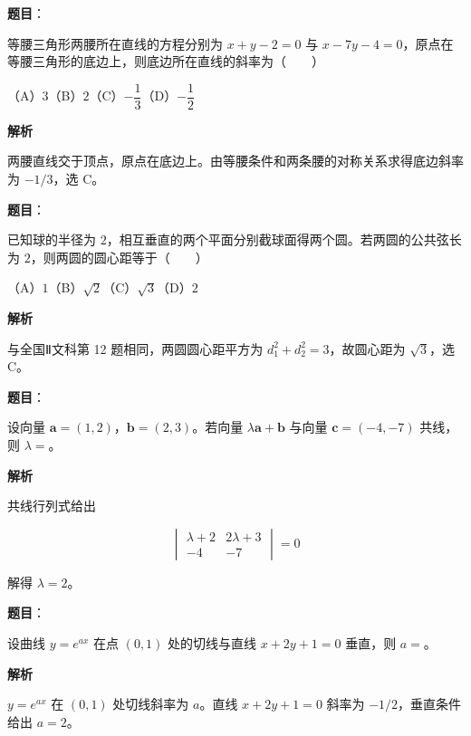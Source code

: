 \begin{answer}

\textbf{题目}：

等腰三角形两腰所在直线的方程分别为 $x+y-2=0$ 与 $x-7y-4=0$，原点在等腰三角形的底边上，则底边所在直线的斜率为\mbox{（　　）}

（A）$3$\quad（B）$2$\quad（C）$-\dfrac13$\quad（D）$-\dfrac12$

\textbf{解析}

两腰直线交于顶点，原点在底边上。由等腰条件和两条腰的对称关系求得底边斜率为 $-1/3$，选 C。


\end{answer}
\begin{answer}

\textbf{题目}：

已知球的半径为 $2$，相互垂直的两个平面分别截球面得两个圆。若两圆的公共弦长为 $2$，则两圆的圆心距等于\mbox{（　　）}

（A）$1$\quad（B）$\sqrt2$\quad（C）$\sqrt3$\quad（D）$2$

\textbf{解析}

与全国Ⅱ文科第 12 题相同，两圆圆心距平方为 $d_1^2+d_2^2=3$，故圆心距为 $\sqrt3$，选 C。


\end{answer}
\begin{answer}

\textbf{题目}：

设向量 $\boldsymbol a=(1,2)$，$\boldsymbol b=(2,3)$。若向量 $\lambda\boldsymbol a+\boldsymbol b$ 与向量 $\boldsymbol c=(-4,-7)$ 共线，则 $\lambda=$\gkblank{}。

\textbf{解析}

共线行列式给出

\nopagebreak[4]
\[
\begin{vmatrix}\lambda+2&2\lambda+3\\-4&-7\end{vmatrix}=0
\]

解得 $\lambda=2$。


\end{answer}
\begin{answer}

\textbf{题目}：

设曲线 $y=e^{ax}$ 在点 $(0,1)$ 处的切线与直线 $x+2y+1=0$ 垂直，则 $a=$\gkblank{}。

\textbf{解析}

$y=e^{ax}$ 在 $(0,1)$ 处切线斜率为 $a$。直线 $x+2y+1=0$ 斜率为 $-1/2$，垂直条件给出 $a=2$。


\end{answer}
